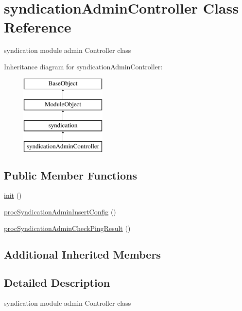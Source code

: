 \hypertarget{classsyndicationAdminController}{\section{syndication\-Admin\-Controller Class Reference}
\label{classsyndicationAdminController}
}


syndication module admin Controller class  


Inheritance diagram for syndication\-Admin\-Controller\-:\begin{figure}[H]
\begin{center}
\leavevmode
\includegraphics[height=4.000000cm]{classsyndicationAdminController}
\end{center}
\end{figure}
\subsection*{Public Member Functions}
\begin{DoxyCompactItemize}
\item 
\hyperlink{classsyndicationAdminController_a4883a0cfe8dc2f1e95e6eb1b98d4900b}{init} ()
\item 
\hyperlink{classsyndicationAdminController_a68e724ed9561fd810aff87a34cd17bf7}{proc\-Syndication\-Admin\-Insert\-Config} ()
\item 
\hyperlink{classsyndicationAdminController_a9422baea466cdcd8a82cf87284fc21df}{proc\-Syndication\-Admin\-Check\-Ping\-Result} ()
\end{DoxyCompactItemize}
\subsection*{Additional Inherited Members}


\subsection{Detailed Description}
syndication module admin Controller class 

